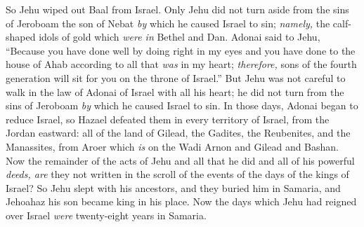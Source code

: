 \begin{biblechapter}
\verse So Jehu wiped out Baal from Israel.
\verse Only Jehu did not turn aside from the sins of Jeroboam the son of Nebat \textit{by} which he caused Israel to sin; \textit{namely,} the calf-shaped idols of gold which \textit{were in} Bethel and Dan.
\verse Adonai said to Jehu, “Because you have done well by doing right in my eyes and you have done to the house of Ahab according to all that \textit{was} in my heart; \textit{therefore,} sons of the fourth generation will sit for you on the throne of Israel.”
\verse But Jehu was not careful to walk in the law of Adonai of Israel with all his heart; he did not turn from the sins of Jeroboam \textit{by} which he caused Israel to sin.
\verse In those days, Adonai began to reduce Israel, so Hazael defeated them in every territory of Israel,
\verse from the Jordan eastward: all of the land of Gilead, the Gadites, the Reubenites, and the Manassites, from Aroer which \textit{is} on the Wadi Arnon and Gilead and Bashan.
\verse Now the remainder of the acts of Jehu and all that he did and all of his powerful \textit{deeds, are} they not written in the scroll of the events of the days of the kings of Israel?
\verse So Jehu slept with his ancestors, and they buried him in Samaria, and Jehoahaz his son became king in his place.
\verse Now the days which Jehu had reigned over Israel \textit{were} twenty-eight years in Samaria.
\end{biblechapter}

